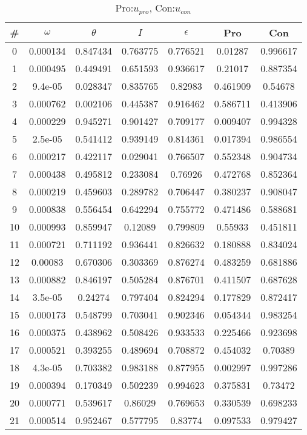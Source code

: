 \begin{table}
\caption{Pro:$u_{pro}$, Con:$u_{con}$}
\begin{tabular}{c|c|c|c|c|c|c}
\# & $\omega$ & $\theta$ & $I$ & $\epsilon$ & Pro & Con\\
\hline
0 & 0.000134 & 0.847434 & 0.763775 & 0.776521 & 0.01287 & 0.996617\\
1 & 0.000495 & 0.449491 & 0.651593 & 0.936617 & 0.21017 & 0.887354\\
2 & 9.4e-05 & 0.028347 & 0.835765 & 0.82983 & 0.461909 & 0.54678\\
3 & 0.000762 & 0.002106 & 0.445387 & 0.916462 & 0.586711 & 0.413906\\
4 & 0.000229 & 0.945271 & 0.901427 & 0.709177 & 0.009407 & 0.994328\\
5 & 2.5e-05 & 0.541412 & 0.939149 & 0.814361 & 0.017394 & 0.986554\\
6 & 0.000217 & 0.422117 & 0.029041 & 0.766507 & 0.552348 & 0.904734\\
7 & 0.000438 & 0.495812 & 0.233084 & 0.76926 & 0.472768 & 0.852364\\
8 & 0.000219 & 0.459603 & 0.289782 & 0.706447 & 0.380237 & 0.908047\\
9 & 0.000838 & 0.556454 & 0.642294 & 0.755772 & 0.471486 & 0.588681\\
10 & 0.000993 & 0.859947 & 0.12089 & 0.799809 & 0.55933 & 0.451811\\
11 & 0.000721 & 0.711192 & 0.936441 & 0.826632 & 0.180888 & 0.834024\\
12 & 0.00083 & 0.670306 & 0.303369 & 0.876274 & 0.483259 & 0.681886\\
13 & 0.000882 & 0.846197 & 0.505284 & 0.876701 & 0.411507 & 0.687628\\
14 & 3.5e-05 & 0.24274 & 0.797404 & 0.824294 & 0.177829 & 0.872417\\
15 & 0.000173 & 0.548799 & 0.703041 & 0.902346 & 0.054344 & 0.983254\\
16 & 0.000375 & 0.438962 & 0.508426 & 0.933533 & 0.225466 & 0.923698\\
17 & 0.000521 & 0.393255 & 0.489694 & 0.708872 & 0.454032 & 0.70389\\
18 & 4.3e-05 & 0.703382 & 0.983188 & 0.877955 & 0.002997 & 0.997286\\
19 & 0.000394 & 0.170349 & 0.502239 & 0.994623 & 0.375831 & 0.73472\\
20 & 0.000771 & 0.539617 & 0.86029 & 0.769653 & 0.330539 & 0.698233\\
21 & 0.000514 & 0.952467 & 0.577795 & 0.83774 & 0.097533 & 0.979427\\

\end{tabular}
\end{table}
